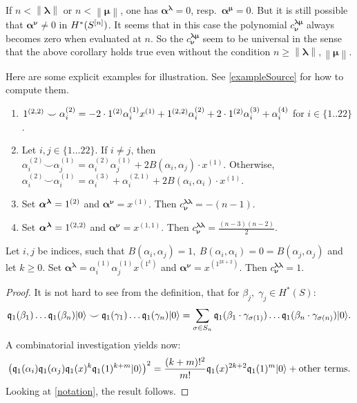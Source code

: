 \begin{remark}
If $n<\left\|\boldsymbol\lambda\right\|$ or $n<\left\|\boldsymbol\mu\right\| $, one has $\boldsymbol{\alpha}^{\boldsymbol{\lambda}}=0$, resp.~$\boldsymbol{\alpha}^{\boldsymbol{\mu}}=0$. But it is still possible that $\boldsymbol{\alpha}^{\boldsymbol{\nu}}\neq 0$ in $H^*(S^{[n]})$. It seems that in this case the polynomial $ c^{\boldsymbol{\lambda\mu}}_{\boldsymbol{\nu}}$ always becomes zero when evaluated at $n$. So the $ c^{\boldsymbol{\lambda\mu}}_{\boldsymbol{\nu}}$ seem to be universal in the sense that the above corollary holds true even without the condition $n\geq\left\|\boldsymbol\lambda\right\|,\left\|\boldsymbol\mu\right\| $.
\end{remark}
\begin{example}\label{example} Here are some explicit examples for illustration. See \ref{exampleSource} for how to compute them. 
\begin{enumerate} \item $
1^{(2,2)}\smile \alpha_i^{(2)} = -2\cdot 1^{(2)}\alpha_i^{(1)}x^{(1)} + 1^{(2,2)}\alpha_i^{(2)} + 2\cdot1^{(2)}\alpha_i^{(3)} +\alpha_i^{(4)} $ for $i\in\{1..22\}$.
\item Let $i,j\in\{1\ldots 22\}$. 
If $i \neq j$, then $\alpha_i^{(2)}\smile\alpha_j^{(1)} = \alpha_i^{(2)}\alpha_j^{(1)} + 2B(\alpha_i,\alpha_j)\cdot x^{(1)}$. 
Otherwise, $\alpha_i^{(2)}\smile\alpha_i^{(1)} = \alpha_i^{(3)}+ \alpha_i^{(2,1)} + 2B(\alpha_i,\alpha_i)\cdot x^{(1)}$.
\item Set $\boldsymbol{\alpha}^{\boldsymbol{\lambda}} = 1^{(2)}$ and $\boldsymbol{\alpha}^{\boldsymbol{\nu}}=x^{(1)}$. Then $c^{\boldsymbol{\lambda\lambda}}_{\boldsymbol{\nu}} = -(n-1)$.
\item Set $\boldsymbol{\alpha}^{\boldsymbol{\lambda}} = 1^{(2,2)}$ and $\boldsymbol{\alpha}^{\boldsymbol{\nu}}=x^{(1,1)}$. Then $c^{\boldsymbol{\lambda\lambda}}_{\boldsymbol{\nu}} =\frac{(n-3)(n-2)}{2}$.
\end{enumerate}
\end{example}
\begin{example} \label{oddWitness} Let $i,j$ be indices, such that $B(\alpha_i,\alpha_j)=1,\ B(\alpha_i,\alpha_i)=0=B(\alpha_j,\alpha_j)$ and let $k\geq 0$. Set $\boldsymbol{\alpha}^{\boldsymbol{\lambda}} = \alpha_i^{(1)}\alpha_j^{(1)}x^{(1^k)}$ 
and $\boldsymbol{\alpha}^{\boldsymbol{\nu}}= x^{(1^{2k+2})}$. Then $c^{\boldsymbol{\lambda\lambda}}_{\boldsymbol{\nu}} =1$.
\end{example}
\begin{proof}
It is not hard to see from the definition, that for $\beta_j,\;\gamma_j\in H^*(S)$:
$$
\mathfrak{q}_1(\beta_1)\ldots\mathfrak{q}_1(\beta_n)|0\rangle \smile\mathfrak{q}_1(\gamma_1)\ldots\mathfrak{q}_1(\gamma_n)|0\rangle = \sum_{\sigma \in S_n} \mathfrak{q}_1(\beta_1\cdot\gamma_{\sigma(1)})\ldots\mathfrak{q}_1(\beta_n\cdot\gamma_{\sigma(n)})|0\rangle.
$$ 
A combinatorial investigation yields now:
$$
\left(\mathfrak{q}_1(\alpha_i)\mathfrak{q}_1(\alpha_j)\mathfrak{q}_1(x)^k\mathfrak{q}_1(1)^{k+m}|0\rangle \right)^2 = \frac{(k+m)!^2}{m!} \mathfrak{q}_1(x)^{2k+2}\mathfrak{q}_1(1)^m|0\rangle + \text{other terms}.
$$
Looking at \ref{notation}, the result follows.
\end{proof}
